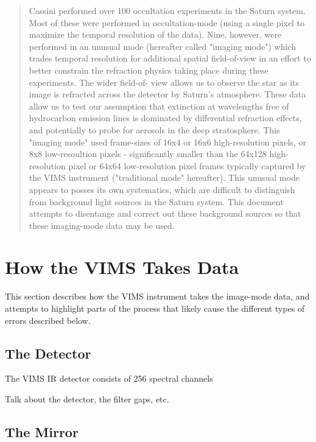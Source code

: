 \documentclass[12pt]{article}
\begin{document}
\maketitle

\begin{abstract}
Cassini performed over 100 occultation experiments in the Saturn system. Most
of these were performed in occultation-mode (using a single pixel to maximize
the temporal resolution of the data). Nine, however, were performed in an
unusual mode (hereafter called "imaging mode") which trades temporal resolution
for additional spatial field-of-view in an effort to better constrain the
refraction physics taking place during these experiments. The wider field-of-
view allows us to observe the star as its image is refracted across the
detector by Saturn's atmosphere. These data allow us to test our assumption
that extinction at wavelengths free of hydrocarbon emission lines is dominated
by differential refraction effects, and potentially to probe for aerosols in
the deep stratosphere. This "imaging mode" used frame-sizes of 16x4 or 16x6
high-resolution pixels, or 8x8 low-resoultion pixels - significantly smaller
than the 64x128 high-resolution pixel or 64x64 low-resolution pixel frames
typically captured by the VIMS instrument ("traditional mode" hereafter). This
unusual mode appears to posses its own systematics, which are difficult to
distinguish from background light sources in the Saturn system. This document
attempts to disentange and correct out these background sources so that these
imaging-mode data may be used.
\end{abstract}

\section{How the VIMS Takes Data}

This section describes how the VIMS instrument takes the image-mode data, and
attempts to highlight parts of the process that likely cause the different
types of errors described below.

\subsection{The Detector}

The VIMS IR detector consists of 256 spectral channels

Talk about the detector, the filter gaps, etc.

\subsection{The Mirror}
\end{document}
